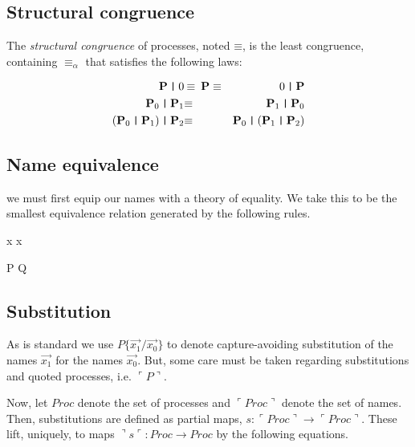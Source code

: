 \documentclass[]{amsart}
\newcommand{\lpquote}{\ulcorner}
\newcommand{\rpquote}{\urcorner}
\newcommand{\id}[1]{\texttt{#1}}
\newcommand{\pzero}{\mathbin{0}}
\newcommand{\juxtap}{\mathbin{\id{|}}}
\newcommand{\scong}{\mathbin{\equiv}}
\newcommand{\nameeq}{\mathbin{\equiv_N}}
\newcommand{\alphaeq}{\mathbin{\equiv_{\alpha}}}
\newcommand{\quotep}[1]{\lpquote #1 \rpquote}
\newcommand{\dropn}[1]{\rpquote #1 \lpquote}
\newcommand{\Proc}{\mathbin{Proc}}
\newcommand{\QProc}{\quotep{\mathbin{Proc}}}
\newcommand{\category}[1]{\mbox{\bf #1}}
\theoremstyle{definition}
\theoremstyle{remark}
\numberwithin{equation}{subsection}
\begin{document}
\subsection{Structural congruence}

The {\em structural congruence} of processes, noted $\scong$, is the
least congruence, containing $\alphaeq$ that satisfies the following
laws:

\begin{eqnarray*}
	\category{P} \juxtap \pzero	
		&  \scong \; \category{P} \; \scong & 
			\pzero \juxtap \category{P} \\
	\category{P}_0 \juxtap \category{P}_1	
		& \scong & 
			\category{P}_1 \juxtap \category{P}_0 \\
	(\category{P}_0 \juxtap \category{P}_1) \juxtap \category{P}_2	
		& \scong & 
			\category{P}_0 \juxtap (\category{P}_1 \juxtap \category{P}_2) \\
\end{eqnarray*}

\subsection{Name equivalence}

we must first equip our names with a theory of equality. We take this
to be the smallest equivalence relation generated by the following
rules.

{ \quotep{\dropn{x}} \nameeq x }

\infrule[Struct-equiv]
{ P \scong Q }
{ \quotep{P} \nameeq \quotep{Q} }

\subsection{Substitution}

As is standard we use $P\id{\{}\vec{x_1} / \vec{x_0} \id{\}}$ to
denote capture-avoiding substitution of the names $\vec{x_1}$ for the
names $\vec{x_0}$. But, some care must be taken regarding
substitutions and quoted processes, i.e. $\quotep{P}$. 

Now, let $\Proc$ denote the set of processes and
$\QProc$ denote the set of names. Then, substitutions
are defined as partial maps, $s : \QProc \rightarrow \QProc$. These lift, uniquely, to maps $\dropn{s} :
\Proc \rightarrow \Proc$ by the following equations.
\end{document}
